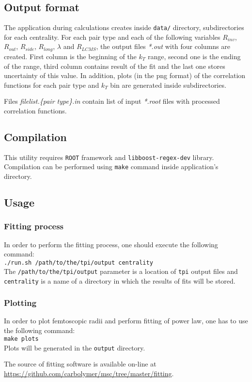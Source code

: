     \subsection{Output format}
      The application during calculations creates inside \verb|data/| directory, subdirectories for each centrality.
      For each pair type and each of the following variables $R_{inv}$, $R_{out}$, $R_{side}$, $R_{long}$, $\lambda$ and $R_{LCMS}$, the output files \textit{*.out} with four columns are created.
      First column is the beginning of the $k_T$ range, second one is the ending of the range, third column contains result of the fit and the last one stores uncertainty of this value.
      In addition, plots (in the png format) of the correlation functions for each pair type and $k_T$ bin are generated inside subdirectories.

      Files \textit{filelist.\{pair type\}.in} contain list of input \textit{*.root} files with processed correlation functions.
    \subsection{Compilation}
      This utility requires \verb|ROOT| framework and \verb|libboost-regex-dev| library.
      Compilation can be performed using \verb|make| command inside application's directory.
    \subsection{Usage}
      \subsubsection{Fitting process}
        In order to perform the fitting process, one should execute the following command:\\
        \verb|./run.sh /path/to/the/tpi/output centrality|\\
        The \verb|/path/to/the/tpi/output| parameter is a location of \verb|tpi| output files and \verb|centrality| is a name of a directory in which the results of fits will be stored.
      \subsubsection{Plotting}
        In order to plot femtoscopic radii and perform fitting of power law, one has to use the following command:\\
        \verb|make plots|\\
        Plots will be generated in the \verb|output| directory.

        The source of fitting software is available on-line at \url{https://github.com/carbolymer/msc/tree/master/fitting}.
